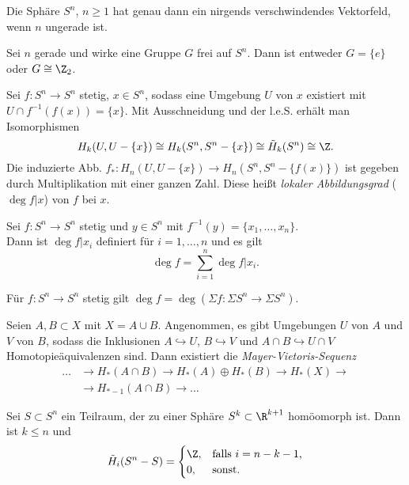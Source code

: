 \documentclass{cheat-sheet}
\newcommand{\RH}{\tilde{H}} %
\begin{document}
\begin{satz}
  Die Sphäre $S^n$, $n \geq 1$ hat genau dann ein nirgends verschwindendes Vektorfeld, wenn $n$ ungerade ist.
\end{satz}

\begin{satz}
  Sei $n$ gerade und wirke eine Gruppe $G$ frei auf $S^n$. Dann ist entweder $G = \{ e \}$ oder $G \cong \Z_2$.
\end{satz}


\begin{defn}
  Sei $f : S^n \to S^n$ stetig, $x \in S^n$, sodass eine Umgebung $U$ von $x$ existiert mit $U \cap f^{-1}(f(x)) = \{ x \}$. Mit Ausschneidung und der l.e.S. erhält man Isomorphismen
  \[ H_k(U, U - \{ x \}) \cong H_k(S^n, S^n - \{ x \}) \cong \RH_k(S^n) \cong \Z. \]
  Die induzierte Abb. $f_* : H_n(U, U - \{ x \}) \to H_n(S^n, S^n - \{ f(x) \})$ ist gegeben durch Multiplikation mit einer ganzen Zahl. Diese heißt \emph{lokaler Abbildungsgrad} ($\deg f|x$) von $f$ bei $x$.
\end{defn}

\begin{prop}
  Sei $f : S^n \to S^n$ stetig und $y {\in} S^n$ mit $f^{-1}(y) = \{ x_1, \ldots, x_n \}$.\\
  Dann ist $\deg f|x_i$ definiert für $i = 1, \ldots, n$ und es gilt
  \[ \deg f = \sum_{i=1}^n \deg f|x_i. \]
\end{prop}

\begin{prop}
  Für $f : S^n \to S^n$ stetig gilt 
  $\deg f = \deg (\Sigma f : \Sigma S^n \to \Sigma S^n)$.
\end{prop}

\begin{prop}
  Seien $A, B \subset X$ mit $X = A \cup B$. Angenommen, es gibt Umgebungen $U$ von $A$ und $V$ von $B$, sodass die Inklusionen $A \hookrightarrow U$, $B \hookrightarrow V$ und $A \cap B \hookrightarrow U \cap V$ Homotopieäquivalenzen sind. Dann existiert die \emph{Mayer-Vietoris-Sequenz}
  \begin{align*}
    \ldots & \to H_*(A \cap B) \to H_*(A) \oplus H_*(B) \to H_*(X) \to \\
    & \to H_{*-1}(A \cap B) \to \ldots
  \end{align*}
\end{prop}

\begin{prop}
  Sei $S \subset S^n$ ein Teilraum, der zu einer Sphäre $S^k \subset \R^{k+1}$ homöomorph ist. Dann ist $k \leq n$ und
  \[ \RH_i(S^n - S) = \begin{cases}
    \Z, & \text{falls $i = n - k - 1$,} \\
    0, & \text{sonst.}
  \end{cases} \]
\end{prop}
\end{document}
